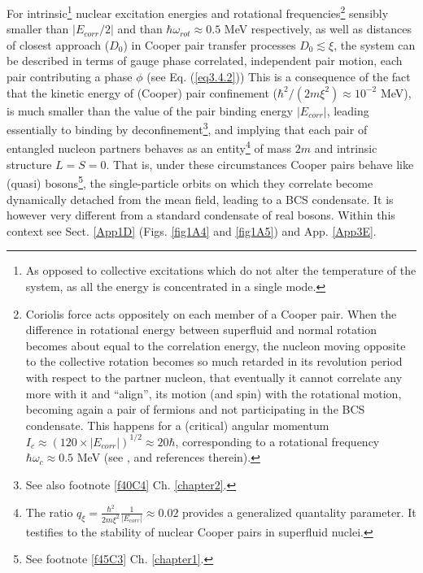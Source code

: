 For intrinsic\footnote{As opposed to collective excitations which do not alter the temperature of the system, as all the energy is concentrated in a single mode.} nuclear excitation energies and rotational frequencies\footnote{Coriolis force acts oppositely on each member of a Cooper pair. When the difference in rotational energy between superfluid and normal rotation becomes about equal to the correlation energy, the nucleon moving opposite to the collective rotation becomes so much retarded in its revolution period with respect to the partner nucleon, that eventually it cannot correlate any more with it and ``align'', its motion (and spin) with the rotational motion, becoming again a pair of fermions and not participating in the BCS  condensate. This happens for a (critical) angular momentum $I_c\approx(120\times|E_{corr}|)^{1/2}\approx 20\hbar$, corresponding to a rotational frequency $\hbar\omega_c\approx 0.5$ MeV (see \cite{Bohr:75}, \cite{Broglia:13} and references therein).} sensibly smaller than $|E_{corr}/2|$ and than $\hbar\omega_{rot}\approx0.5$ MeV respectively, as well as distances of closest approach 
 ($D_0$) in Cooper pair transfer processes $D_0\lesssim\xi$,  
 the system can be described in terms of gauge phase correlated,  independent pair motion, each pair contributing a phase $\phi$ (see Eq. (\ref{eq3.4.2})) This is a consequence of the fact that the kinetic energy of (Cooper) pair confinement ($\hbar^2/(2m\xi^2)\approx 10^{-2}$ MeV), is much smaller than the  value of the pair binding energy $|E_{corr}|$,  leading essentially to binding by 
    deconfinement\footnote{See also footnote \ref{f40C4} Ch. \ref{chapter2}.}, and implying that each pair of entangled nucleon partners 
    behaves as an entity\footnote{
    	 The ratio $q_\xi=\frac{\hbar^2}{2m\xi^2}\frac{1}{|E_{corr}|}\approx 0.02$ provides a generalized quantality parameter. It testifies to the stability of nuclear Cooper pairs in superfluid nuclei. } of mass $2m$ and intrinsic structure $L=S=0$. That is, under these circumstances Cooper pairs behave like (quasi) 
  bosons\footnote{See footnote \ref{f45C3} Ch. \ref{chapter1}.}, the single-particle orbits on which they correlate become dynamically detached from the mean field, leading to a BCS condensate. It is however very different from a standard condensate of real bosons. Within this context see  Sect. \ref{App1D} (Figs. \ref{fig1A4} and \ref{fig1A5}) and App. \ref{App3E}.

